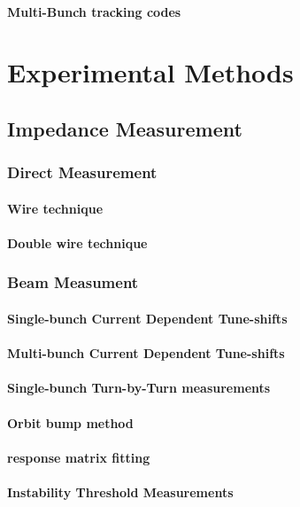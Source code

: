 \documentclass[
	12pt,				%
	openright,			%
	oneside,			%
	a4paper,		%
	chapter=TITLE,		%
	section=TITLE,		%
    brazil,				%
	english,			%
	sumario=tradicional,
	]{abntex2}
\begin{document}
      \subsubsection{Multi-Bunch tracking codes}


\chapter{Experimental Methods}
  \section{Impedance Measurement}
    \subsection{Direct Measurement}
      \subsubsection{Wire technique}
      \subsubsection{Double wire technique}
    \subsection{Beam Measument}
      \subsubsection{Single-bunch Current Dependent Tune-shifts}
      \subsubsection{Multi-bunch Current Dependent Tune-shifts}
      \subsubsection{Single-bunch Turn-by-Turn measurements}
      \subsubsection{Orbit bump method}
      \subsubsection{response matrix fitting}
      \subsubsection{Instability Threshold Measurements}
\end{document}
